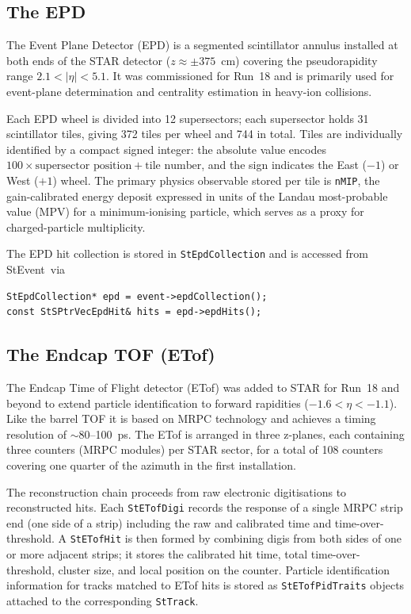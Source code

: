 \documentclass[twoside]{article}
\newcommand{\StEvent}{\textsf{StEvent}}
\begin{document}
\subsection{The EPD}

The Event Plane Detector (EPD) is a segmented scintillator annulus installed
at both ends of the STAR detector ($z\approx\pm375$~cm) covering the
pseudorapidity range $2.1 < |\eta| < 5.1$.  It was commissioned for Run~18
and is primarily used for event-plane determination and centrality estimation
in heavy-ion collisions.

Each EPD wheel is divided into 12 supersectors; each supersector holds
31 scintillator tiles, giving 372 tiles per wheel and 744 in total.  Tiles
are individually identified by a compact signed integer: the absolute value
encodes $100\times\text{supersector position}+\text{tile number}$, and the
sign indicates the East ($-1$) or West ($+1$) wheel.  The primary physics
observable stored per tile is \texttt{nMIP}, the gain-calibrated energy
deposit expressed in units of the Landau most-probable value (MPV) for a
minimum-ionising particle, which serves as a proxy for charged-particle
multiplicity.

The EPD hit collection is stored in \texttt{StEpdCollection} and is accessed
from \StEvent\ via
\begin{verbatim}
StEpdCollection* epd = event->epdCollection();
const StSPtrVecEpdHit& hits = epd->epdHits();
\end{verbatim}

\subsection{The Endcap TOF (ETof)}

The Endcap Time of Flight detector (ETof) was added to STAR for Run~18 and
beyond to extend particle identification to forward rapidities
($-1.6 < \eta < -1.1$).  Like the barrel TOF it is based on MRPC technology
and achieves a timing resolution of $\sim$80--100~ps.  The ETof is arranged
in three z-planes, each containing three counters (MRPC modules) per STAR
sector, for a total of 108 counters covering one quarter of the azimuth in
the first installation.

The reconstruction chain proceeds from raw electronic digitisations to
reconstructed hits.  Each \texttt{StETofDigi} records the response of a
single MRPC strip end (one side of a strip) including the raw and calibrated
time and time-over-threshold.  A \texttt{StETofHit} is then formed by
combining digis from both sides of one or more adjacent strips; it stores the
calibrated hit time, total time-over-threshold, cluster size, and local
position on the counter.  Particle identification information for tracks
matched to ETof hits is stored as \texttt{StETofPidTraits} objects attached
to the corresponding \texttt{StTrack}.
\end{document}
